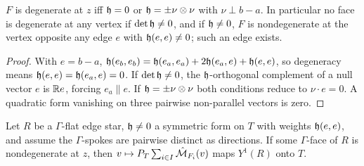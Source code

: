 \begin{lemma}\label{k3:degface}
$F$ is degenerate at $z$ iff $\mathfrak h=0$ or $\mathfrak h=\pm\nu\otimes\nu$ with $\nu\perp b-a$. In particular no face is degenerate at any vertex if $\det\mathfrak h\ne0$, and if $\mathfrak h\ne0$, $F$ is nondegenerate at the vertex opposite any edge $e$ with $\mathfrak h(e,e)\ne0$; such an edge exists.
\end{lemma}

\begin{proof}
With $e=b-a$, $\mathfrak h(e_b,e_b)=\mathfrak h(e_a,e_a)+2\mathfrak h(e_a,e)+\mathfrak h(e,e)$, so degeneracy means $\mathfrak h(e,e)=\mathfrak h(e_a,e)=0$. If $\det\mathfrak h\ne0$, the $\mathfrak h$-orthogonal complement of a null vector $e$ is $\mathbb R e$, forcing $e_a\parallel e$. If $\mathfrak h=\pm\nu\otimes\nu$ both conditions reduce to $\nu\cdot e=0$. A quadratic form vanishing on three pairwise non-parallel vectors is zero.
\end{proof}

\begin{theorem}\label{k3:nondeg}
Let $R$ be a $\Gamma$-flat edge star, $\mathfrak h\ne0$ a symmetric form on $T$ with weights $\mathfrak h(e,e)$, and assume the $\Gamma$-spokes are pairwise distinct as directions. If some $\Gamma$-face of $R$ is nondegenerate at $z$, then $v\mapsto P_T\sum_{i\in I}\hat{\mathcal M}_{F_i}(v)$ maps $Y^1(R)$ onto $T$.
\end{theorem}

